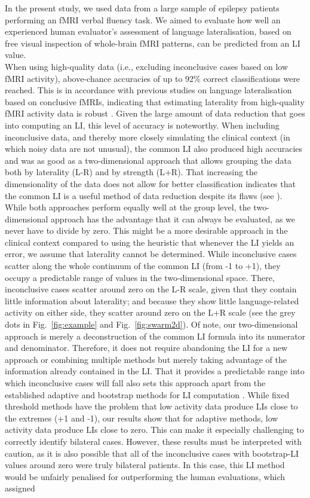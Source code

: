 \documentclass[fleqn,10pt]{SelfArx} %
\begin{document}
In the present study, we used data from a large sample of epilepsy patients performing an fMRI verbal fluency task. We aimed to evaluate how well an experienced human evaluator’s assessment of language lateralisation, based on free visual inspection of whole-brain fMRI patterns, can be predicted from an LI value.\\
When using high-quality data (i.e., excluding inconclusive cases based on low fMRI activity), above-chance accuracies of up to 92\% correct classifications were reached. This is in accordance with previous studies on language lateralisation based on conclusive fMRIs, indicating that estimating laterality from high-quality fMRI activity data is robust \citep{Woermann_2003, Jones_2011, Janecek_2013}. Given the large amount of data reduction that goes into computing an LI, this level of accuracy is noteworthy. When including inconclusive data, and thereby more closely simulating the clinical context (in which noisy data are not unusual), the common LI also produced high accuracies and was as good as a two-dimensional approach that allows grouping the data both by laterality (L-R) and by strength (L+R). That increasing the dimensionality of the data does not allow for better classification indicates that the common LI is a useful method of data reduction despite its flaws (see \citealt{Jansen_2006, Seghier_2008}). While both approaches perform equally well at the group level, the two-dimensional approach has the advantage that it can always be evaluated, as we never have to divide by zero. This might be a more desirable approach in the clinical context compared to using the heuristic that whenever the LI yields an error, we assume that laterality cannot be determined. While inconclusive cases scatter along the whole continuum of the common LI (from -1 to +1), they occupy a predictable range of values in the two-dimensional space. There, inconclusive cases scatter around zero on the L-R scale, given that they contain little information about laterality; and because they show little language-related activity on either side, they scatter around zero on the L+R scale (see the grey dots in Fig.~\ref{fig:example} and Fig.~\ref{fig:swarm2d}). Of note, our two-dimensional approach is merely a deconstruction of the common LI formula into its numerator and denominator. Therefore, it does not require abandoning the LI for a new approach or combining multiple methods but merely taking advantage of the information already contained in the LI. That it provides a predictable range into which inconclusive cases will fall also sets this approach apart from the established adaptive and bootstrap methods for LI computation \citep{Wilke_2006, Wilke_2007}. While fixed threshold methods have the problem that low activity data produce LIs close to the extremes (+1 and -1), our results show that for adaptive methods, low activity data produce LIs close to zero. This can make it especially challenging to correctly identify bilateral cases. However, these results must be interpreted with caution, as it is also possible that all of the inconclusive cases with bootstrap-LI values around zero were truly bilateral patients. In this case, this LI method would be unfairly penalised for outperforming the human evaluations, which assigned 
\end{document}
